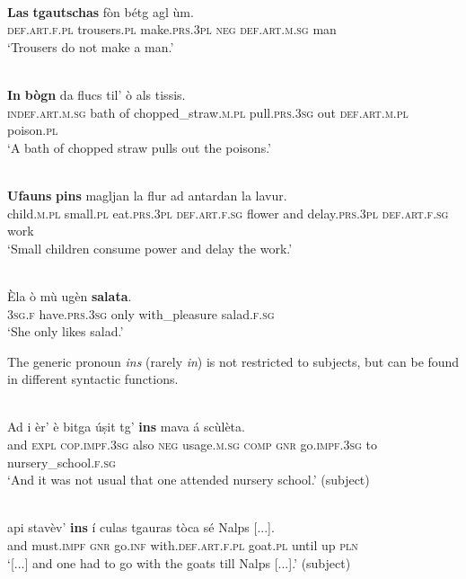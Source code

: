 \ea\label{ex:gen:3}
\\
\gll \textbf{Las} \textbf{tgautschas} fòn bétg agl ùm. \\
  \textsc{def.art.f.pl} trousers.\textsc{pl} make.\textsc{prs.3pl} \textsc{neg} \textsc{def.art.m.sg} man \\
\glt `Trousers do not make a man.'
\z


\ea\label{ex:gen:4}
\\
\gll  \textbf{In} \textbf{bògn} da flucs til’ ò als tissis.\\
\textsc{indef.art.m.sg} bath of chopped\_straw.\textsc{m.pl} pull.\textsc{prs.3sg} out \textsc{def.art.m.pl} poison.\textsc{pl} \\
\glt `A bath of chopped straw pulls out the poisons.'
\z

\ea\label{ex:gen:5}
\\
\gll  \textbf{Ufauns} \textbf{pins} magljan la flur ad antardan la lavur.\\
child.\textsc{m.pl} small.\textsc{pl} eat.\textsc{prs.3pl} \textsc{def.art.f.sg} flower and delay.\textsc{prs.3pl} \textsc{def.art.f.sg} work\\
\glt `Small children consume power and delay the work.'
\z

\ea\label{ex:gen:6}
\\
\gll Èla ò mù ugèn \textbf{salata}.\\
\textsc{3sg.f} have.\textsc{prs.3sg} only with\_pleasure salad.\textsc{f.sg}\\
\glt `She only likes salad.'
\z

The generic pronoun \textit{ins} (rarely \textit{in}) is not restricted to subjects, but can be found in different syntactic functions.

\ea\label{ex:ins:1}
\\ 
\gll Ad i èr’ è bitga úṣit tg’ \textbf{ins} mava á scùlèta.\\
and  \textsc{expl} \textsc{cop.impf.3sg} also \textsc{neg} usage.\textsc{m.sg}  \textsc{comp} \textsc{gnr} go.\textsc{impf.3sg} to nursery\_school.\textsc{f.sg}\\
\glt `And it was not usual that one attended nursery school.' (subject)
\z

\ea
\label{ex:ins:2}
\\ 
\gll   [...] api stavèv’ \textbf{ins} í culas tgauras tòca sé Nalps [...]. \\
{} and  must.\textsc{impf} \textsc{gnr} go.\textsc{inf} with.\textsc{def.art.f.pl} goat.\textsc{pl} until up  \textsc{pln}\\
\glt `[...] and one had to go with the goats till Nalps [...].' (subject)
\z

